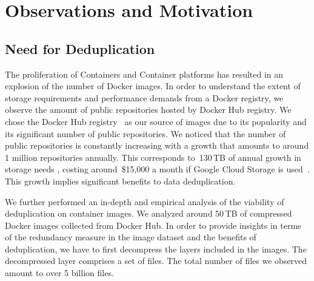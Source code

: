 \section{Observations and Motivation} %
\label{sec:background}

\subsection{Need for Deduplication}

The proliferation of Containers and Container platforms has resulted in an explosion of the number of Docker images.
In order to understand the extent of storage requirements and performance demands from a Docker registry, 
we observe the amount of public repositories hosted by Docker Hub registry. 
We chose the Docker Hub registry~\cite{docker-hub} as our source of images due to its popularity 
and its significant number of public repositories. 
%
%
%
%
We noticed that the number of public repositories is constantly increasing with a growth that amounts 
to around 1 million repositories annually. 
This corresponds to~130\,TB of annual growth in storage needs , 
costing around~\$15,000 a month if Google Cloud Storage is used~\cite{GoogleCloudStoragePricing}.
This growth implies significant benefits to data deduplication. 

We further performed an in-depth and empirical analysis of the viability of deduplication on container images. 
We analyzed around 50\,TB of compressed Docker images collected from Docker Hub. 
In order to provide insights in terms of the redundancy measure in the image dataset and the benefits of deduplication,
we have to first decompress the layers included in the images. 
The decompressed layer comprises a set of files. 
The total number of files we observed amount to over 5 billion files.


